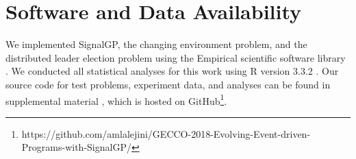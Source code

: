 
\section{Software and Data Availability}

We implemented SignalGP, the changing environment problem, and the distributed leader election problem using the Empirical scientific software library \citep{charles_ofria_2020_empirical}. 
We conducted all statistical analyses for this work using R version 3.3.2 \citep{r_core_team_2016}.
Our source code for test problems, experiment data, and analyses can be found in supplemental material \citep{signalgp_supplement_2018}, which is hosted on GitHub\footnote{https://github.com/amlalejini/GECCO-2018-Evolving-Event-driven-Programs-with-SignalGP/}. 